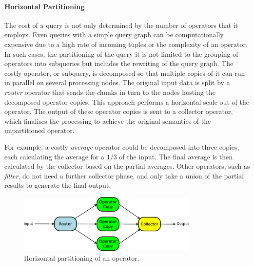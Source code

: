 \paragraph*{Horizontal Partitioning}

The cost of a query is not only determined by the number of operators that it employs. Even queries with
a simple query graph can be computationally expensive due to a high rate of incoming tuples or
the complexity of an operator. In such cases, the partitioning of the query it is not limited to
the grouping of operators into subqueries but includes the rewriting of the query graph. The costly
operator, or subquery, is decomposed so that multiple copies of it can run in parallel on several
processing nodes.
The original input data is split by a \emph{router} operator that sends the chunks in turn to the nodes
hosting the decomposed operator copies.
This approach performs a horizontal scale out of the operator. The output of these operator copies is
sent to a collector operator, which finalises the processing to achieve the original semantics of the
unpartitioned operator.

For example, a costly \emph{average} operator could be decomposed into three copies, each
calculating the average for a $1/3$ of the input. The final average is then calculated by the collector
based on the partial averages.
Other operators, such as \emph{filter}, do not need a further collector phase, and only take a union of
the partial results to generate the final output. 

\begin{figure}[t!]
	\centering	
	\includegraphics[width=0.8\textwidth]{img/tesi/map-reduce2}
	\caption{Horizontal partitioning of an operator. }
	\label{fig:mr-part}
\end{figure}

